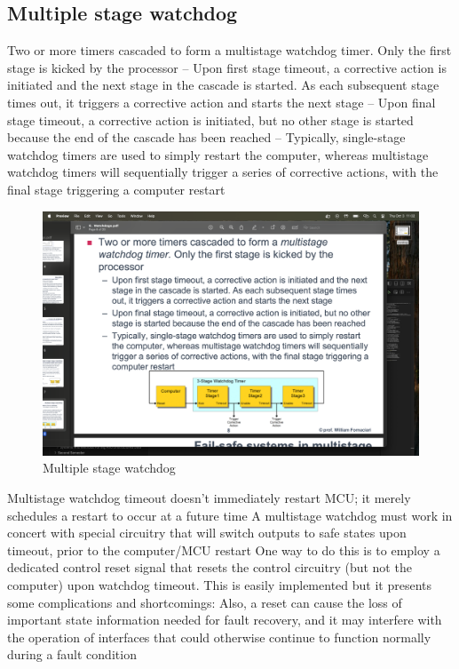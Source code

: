 \subsection{Multiple stage watchdog}
Two or more timers cascaded to form a multistage
watchdog timer. Only the first stage is kicked by the
processor
– Upon first stage timeout, a corrective action is initiated and the next
stage in the cascade is started. As each subsequent stage times
out, it triggers a corrective action and starts the next stage
– Upon final stage timeout, a corrective action is initiated, but no other
stage is started because the end of the cascade has been reached
– Typically, single-stage watchdog timers are used to simply restart
the computer, whereas multistage watchdog timers will sequentially
trigger a series of corrective actions, with the final stage triggering a
computer restart
\begin{figure}[H]
    \centering
    \includegraphics[width=0.75\linewidth]{images/swdog1.png}
    \caption{Multiple stage watchdog}
\end{figure}
Multistage watchdog timeout doesn’t immediately restart
MCU; it merely schedules a restart to occur at a future time
 A multistage watchdog must work in concert with special
circuitry that will switch outputs to safe states upon timeout,
prior to the computer/MCU restart
One way to do this is to employ a dedicated control reset signal that resets the control circuitry (but not the computer) upon watchdog timeout. 
This is easily implemented but it presents some complications and shortcomings:
Also, a reset can cause the loss of important state information needed for fault recovery, and it may interfere with the operation of interfaces that could otherwise continue to function normally during a fault condition

